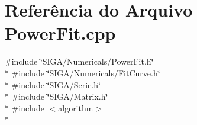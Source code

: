 \section{Referência do Arquivo Power\+Fit.\+cpp}
\label{_power_fit_8cpp}
{\ttfamily \#include \char`\"{}S\+I\+G\+A/\+Numericals/\+Power\+Fit.\+h\char`\"{}}\\*
{\ttfamily \#include \char`\"{}S\+I\+G\+A/\+Numericals/\+Fit\+Curve.\+h\char`\"{}}\\*
{\ttfamily \#include \char`\"{}S\+I\+G\+A/\+Serie.\+h\char`\"{}}\\*
{\ttfamily \#include \char`\"{}S\+I\+G\+A/\+Matrix.\+h\char`\"{}}\\*
{\ttfamily \#include $<$algorithm$>$}\\*
